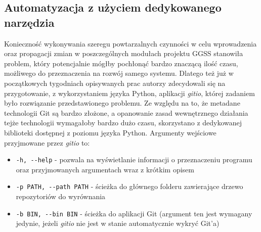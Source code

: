 \subsection{Automatyzacja z użyciem dedykowanego narzędzia}
\label{subsec:gitio}
Konieczność wykonywania szeregu powtarzalnych czynności w celu wprowadzenia oraz propagacji zmian w poszczególnych modułach projektu GGSS stanowiła problem, który potencjalnie mógłby pochłonąć bardzo znaczącą ilość czasu, możliwego do przeznaczenia na rozwój samego systemu. Dlatego też już w początkowych tygodniach opisywanych prac autorzy zdecydowali się na przygotowanie, z wykorzystaniem języka Python, aplikacji \emph{gitio}, której zadaniem było rozwiązanie przedstawionego problemu. Ze względu na to, że metadane technologii Git są bardzo złożone, a opanowanie zasad wewnętrznego działania tejże technologii wymagałoby bardzo dużo czasu, skorzystano z dedykowanej biblioteki dostępnej z poziomu języka Python. Argumenty wejściowe przyjmowane przez \emph{gitio} to:
\begin{itemize}
    \item \lstinline{-h, --help} - pozwala na wyświetlanie informacji o przeznaczeniu programu oraz przyjmowanych argumentach wraz z krótkim opisem
    \item \lstinline{-p PATH, --path PATH} - ścieżka do głównego folderu zawierające drzewo repozytoriów do wyrównania
    \item \lstinline{-b BIN, --bin BIN} - ścieżka do aplikacji Git (argument ten jest wymagany jedynie, jeżeli \emph{gitio} nie jest w stanie automatycznie wykryć Git'a)
\end{itemize}

